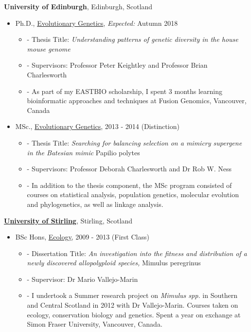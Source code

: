 \documentclass[10pt]{article}
\newenvironment{outerlist}[1][\enskip\textbullet]%
        {\begin{itemize}[#1,leftmargin=*]}{\end{itemize}%
         \vspace{-.6\baselineskip}}
\newenvironment{innerlist}[1][\enskip\textbullet]%
        {\begin{itemize}[#1,leftmargin=*,parsep=0pt,itemsep=0pt,topsep=0pt,partopsep=0pt]}
        {\end{itemize}}
\begin{document}
{\textbf{University of Edinburgh}},
Edinburgh, Scotland
\begin{outerlist}

\item[] Ph.D.,
             \href{http://www.ed.ac.uk/biology/evolutionary-biology} {Evolutionary Genetics},
             \emph{Expected:} Autumn 2018
        \begin{innerlist}
        \item[]- Thesis Title: \emph{Understanding patterns of genetic diversity in the house mouse genome}
        \item[]- Supervisors: Professor Peter Keightley and Professor Brian Charlesworth
        \item[]- As part of my EASTBIO scholarship, I spent 3 months learning bioinformatic approaches and techniques at Fusion Genomics, Vancouver, Canada
        \end{innerlist}

\item[] MSc.,
        \href{http://qgen.bio.ed.ac.uk/}
             {Evolutionary Genetics},
             2013 - 2014 (Distinction)
        \begin{innerlist}
        \item[]- Thesis Title: \emph{Searching for balancing selection on a mimicry supergene in the Batesian mimic} Papilio polytes
        \item[]- Supervisors: Professor Deborah Charlesworth and Dr Rob W. Ness
        \item[]- In addition to the thesis component, the MSc program consisted of courses on statistical analysis, population genetics, molecular evolution and phylogenetics, as well as linkage analysis.
        \end{innerlist}
\end{outerlist}
\vspace{.1in}
\href{}{\textbf{University of Stirling}},
Stirling, Scotland
\begin{outerlist}
\item[] BSc Hons,
        \href{http://www.stir.ac.uk/natural-sciences/about-us/bes/}
             {Ecology}, 2009 - 2013 (First Class)
        \begin{innerlist}
        \item[]- Dissertation Title: \emph{An investigation into the fitness and distribution of a newly discovered allopolyploid species,} Mimulus peregrinus
        \item[]- Supervisor:
                   Dr Mario Vallejo-Marin
        \item[]- I undertook a Summer research project on \emph{Mimulus spp.} in Southern and Central Scotland in 2012 with Dr Vallejo-Marin. Courses taken on ecology, conservation biology and genetics. Spent a year on exchange at Simon Fraser University, Vancouver, Canada.
        \end{innerlist}

\end{outerlist}
\end{document}
